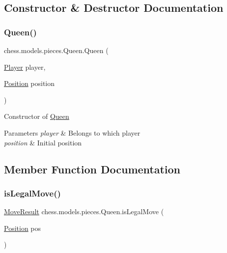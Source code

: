 \subsection{Constructor \& Destructor Documentation}
\mbox{\label{classchess_1_1models_1_1pieces_1_1_queen_acc127213b82632b23448f334512b34b8}} 
\subsubsection{\texorpdfstring{Queen()}{Queen()}}
{\footnotesize\ttfamily chess.\+models.\+pieces.\+Queen.\+Queen (\begin{DoxyParamCaption}\item[{\mbox{\hyperlink{enumchess_1_1models_1_1enums_1_1_player}{Player}}}]{player,  }\item[{\mbox{\hyperlink{classchess_1_1models_1_1_position}{Position}}}]{position }\end{DoxyParamCaption})}

Constructor of \mbox{\hyperlink{classchess_1_1models_1_1pieces_1_1_queen}{Queen}}


\begin{DoxyParams}{Parameters}
{\em player} & Belongs to which player \\
\hline
{\em position} & Initial position \\
\hline
\end{DoxyParams}


\subsection{Member Function Documentation}
\mbox{\label{classchess_1_1models_1_1pieces_1_1_queen_a99486b83609e973af4c09ddcf3582617}} 
\subsubsection{\texorpdfstring{is\+Legal\+Move()}{isLegalMove()}}
{\footnotesize\ttfamily \mbox{\hyperlink{enumchess_1_1models_1_1enums_1_1_move_result}{Move\+Result}} chess.\+models.\+pieces.\+Queen.\+is\+Legal\+Move (\begin{DoxyParamCaption}\item[{\mbox{\hyperlink{classchess_1_1models_1_1_position}{Position}}}]{pos }\end{DoxyParamCaption})}

